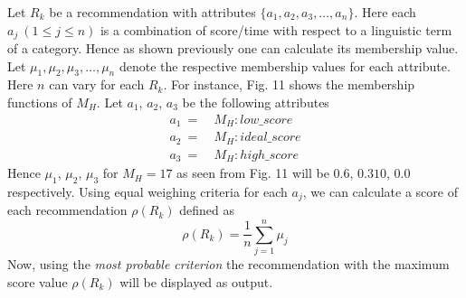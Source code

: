 \documentclass[conference]{IEEEtran}
\begin{document}
Let $R_k$ be a recommendation with attributes $\{a_1, a_2, a_3, \ldots, a_n\}$. Here each $a_j\ (1 \leq j \leq n)$ is a combination of score/time with respect to a linguistic term of a category. Hence as shown previously one can calculate its membership value. Let $\mu_1, \mu_2, \mu_3, \ldots, \mu_n$ denote the respective membership values for each attribute. Here $n$ can vary for each $R_k$.  For instance, Fig. 11 shows the membership functions of $M_H$. Let $a_1$, $a_2$, $a_3$ be the following attributes
\begin{align*}
a_1\ =&\ M_H:low\_score\\
a_2\ =&\ M_H:ideal\_score\\
a_3\ =&\ M_H:high\_score
\end{align*}
Hence $\mu_1$, $\mu_2$, $\mu_3$ for $M_H=17$ as seen from Fig. 11 will be $0.6$, $0.310$, $0.0$ respectively. Using equal weighing criteria for each $a_j$, we can calculate a score of each recommendation $\rho(R_k)$ defined as
$$\rho(R_k) = \frac{1}{n}\sum_{j=1}^{n} \mu_j$$
Now, using the \textit{most probable criterion} the recommendation with the maximum score value $\rho(R_k)$ will be displayed as output.
\end{document}
